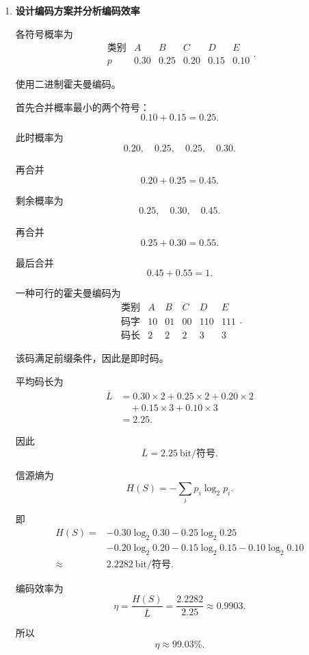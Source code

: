 \documentclass[UTF8,a4paper,12pt]{ctexart}
\begin{document}
\begin{enumerate}[label=\arabic*., leftmargin=2.2em]

\item \textbf{设计编码方案并分析编码效率}

各符号概率为
\[
\begin{array}{c|ccccc}
\text{类别}&A&B&C&D&E\\
\hline
p&0.30&0.25&0.20&0.15&0.10
\end{array}.
\]

使用二进制霍夫曼编码。

首先合并概率最小的两个符号：
\[
0.10+0.15=0.25.
\]

此时概率为
\[
0.20,\quad0.25,\quad0.25,\quad0.30.
\]

再合并
\[
0.20+0.25=0.45.
\]

剩余概率为
\[
0.25,\quad0.30,\quad0.45.
\]

再合并
\[
0.25+0.30=0.55.
\]

最后合并
\[
0.45+0.55=1.
\]

一种可行的霍夫曼编码为
\[
\begin{array}{c|ccccc}
\text{类别}&A&B&C&D&E\\
\hline
\text{码字}&10&01&00&110&111\\
\text{码长}&2&2&2&3&3
\end{array}.
\]

该码满足前缀条件，因此是即时码。

平均码长为
\[
\begin{aligned}
\overline L
&=
0.30\times2
+
0.25\times2
+
0.20\times2\\
&\quad+
0.15\times3
+
0.10\times3\\
&=2.25.
\end{aligned}
\]

因此
\[
\boxed{
\overline L=2.25\ \text{bit/符号}
}.
\]

信源熵为
\[
H(S)
=
-\sum_i p_i\log_2p_i.
\]

即
\[
\begin{aligned}
H(S)
={}&
-0.30\log_2 0.30
-0.25\log_2 0.25\\
&-0.20\log_2 0.20
-0.15\log_2 0.15
-0.10\log_2 0.10\\
\approx{}&2.2282\ \text{bit/符号}.
\end{aligned}
\]

编码效率为
\[
\eta
=
\frac{H(S)}{\overline L}
=
\frac{2.2282}{2.25}
\approx0.9903.
\]

所以
\[
\boxed{\eta\approx99.03\%}.
\]



\end{enumerate}
\end{document}
